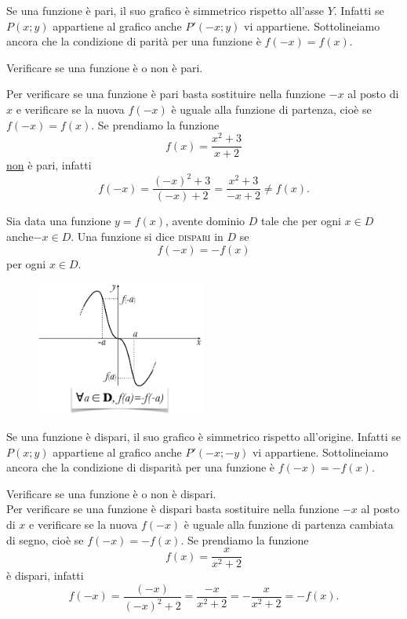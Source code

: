 Se una funzione è pari, il suo grafico è simmetrico rispetto all'asse \(Y\). 
Infatti se \(P(x;y)\) appartiene al grafico anche \(P'(-x;y)\) vi appartiene. 
Sottolineiamo ancora che la condizione di parità per una funzione è \(f(-x)= 
f(x)\).  

\begin{esempio} Verificare se una funzione è o non è pari.

Per verificare se una funzione è pari basta sostituire nella funzione \(-x\) al 
posto di \(x\) e verificare se la nuova \(f(-x)\) è uguale alla funzione di 
partenza, cioè se \(f(-x)=f(x)\). Se prendiamo la funzione 
\[f(x)=\frac{x^2+3}{x+2}\] \underline{non} è pari, infatti 
\[f(-x)=\frac{(-x)^2+3}{(-x)+2}=\frac{x^2+3}{-x+2}\neq f(x).\]
\end{esempio}

\begin{definizione}
Sia data una funzione \(y=f(x)\), avente dominio \(D\) tale che per ogni \(x\in D\) 
anche\( -x\in D.\) Una funzione si dice \textsc{dispari} in \(D\) se
\[f(-x)=-f(x)\]
per ogni \(x\in D\).
\end{definizione}

\begin{figure}[htpb!]
  \centering
  \includegraphics[width=0.5\textwidth]{img/funz_10.png}
\end{figure}
%

Se una funzione è dispari, il suo grafico è simmetrico rispetto all'origine. 
Infatti se \(P(x;y)\) appartiene al grafico anche \(P'(-x;-y)\) vi appartiene. 
Sottolineiamo ancora che la condizione di disparità per una funzione è 
\(f(-x)= -f(x)\). 

\begin{esempio} Verificare se una funzione è o non è dispari.\\
Per verificare se una funzione è dispari basta sostituire nella funzione \(-x\) 
al posto di \(x\) e verificare se la nuova \(f(-x)\) è uguale alla funzione di 
partenza cambiata di segno, cioè se \(f(-x)=-f(x)\). Se prendiamo la funzione 
\[f(x)=\frac{x}{x^2+2}\] è dispari, infatti 
\[f(-x)=\frac{(-x)}{(-x)^2+2}=\frac{-x}{x^2+2}=-\frac{x}{x^2+2}= -f(x).\]
\end{esempio}

